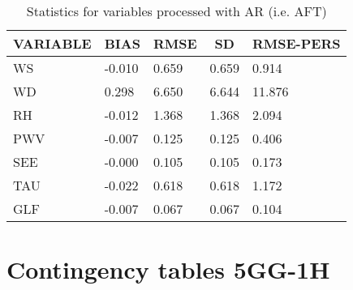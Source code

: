 \documentclass[11pt,english]{article}
\begin{document}
\begin{table}[]
\begin{center}
\begin{tabular}{|l|l|l|l|l|}
\hline
\multicolumn{1}{c|}{\cellcolor[HTML]{C0C0C0}\textbf{VARIABLE}} & \multicolumn{1}{c|}{\cellcolor[HTML]{C0C0C0}\textbf{BIAS}} & \multicolumn{1}{c|}{\cellcolor[HTML]{C0C0C0}\textbf{RMSE}} & \multicolumn{1}{c|}{\cellcolor[HTML]{C0C0C0}\textbf{SD}} & \multicolumn{1}{c|}{\cellcolor[HTML]{C0C0C0}\textbf{RMSE-PERS}}\\\hline
\cellcolor[HTML]{C0C0C0}WS  &    -0.010                                &     0.659                                &     0.659  &     0.914 \\
\cellcolor[HTML]{C0C0C0}WD  &     0.298                                &     6.650                                &     6.644  &    11.876 \\
\cellcolor[HTML]{C0C0C0}RH  &    -0.012                                &     1.368                                &     1.368  &     2.094 \\
\cellcolor[HTML]{C0C0C0}PWV &    -0.007                               &     0.125                               &     0.125 &     0.406 \\
\cellcolor[HTML]{C0C0C0}SEE &    -0.000                               &     0.105                               &     0.105 &     0.173 \\
\cellcolor[HTML]{C0C0C0}TAU &    -0.022                               &     0.618                               &     0.618 &     1.172 \\
\cellcolor[HTML]{C0C0C0}GLF &    -0.007                               &     0.067                               &     0.067 &     0.104 \\
\hline
\end{tabular}
\caption{Statistics for variables processed with AR (i.e. AFT)}
\end{center}
\end{table}
\clearpage
\section{Contingency tables 5GG-1H}
\end{document}
